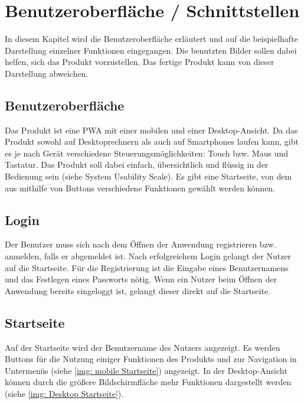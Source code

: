 \renewcommand{\figurename}{Abb.}
\section{Benutzeroberfläche / Schnittstellen}
In diesem Kapitel wird die Benutzeroberfläche erläutert und auf die beispielhafte Darstellung einzelner Funktionen eingegangen. Die benutzten Bilder sollen dabei helfen, sich das Produkt vorzustellen. Das fertige Produkt kann von dieser Darstellung abweichen.
\subsection{Benutzeroberfläche}
Das Produkt ist eine \Gls{PWA} mit einer mobilen und einer \Gls{Desktop}-Ansicht. Da das Produkt sowohl auf \Gls{Desktop}rechnern als auch auf Smartphones laufen kann, gibt es je nach Gerät verschiedene Steuerungsmöglichkeiten: Touch bzw. Maus und Tastatur. Das Produkt soll dabei einfach, übersichtlich und flüssig in der Bedienung sein (siehe \Gls{System Usability Scale}).
Es gibt eine Startseite, von dem aus mithilfe von Buttons verschiedene Funktionen gewählt werden können.

\subsection{Login}
Der Benutzer muss sich nach dem Öffnen der Anwendung registrieren bzw. anmelden, falls er abgemeldet ist. Nach erfolgreichem \Gls{Login} gelangt der Nutzer auf die Startseite. Für die Registrierung ist die Eingabe eines Benutzernamens und das Festlegen eines Passworts nötig. Wenn ein Nutzer beim Öffnen der Anwendung bereits eingeloggt ist, gelangt dieser direkt auf die Startseite.

\subsection{Startseite}
Auf der Startseite wird der Benutzername des Nutzers angezeigt. Es werden Buttons für die Nutzung einiger Funktionen des Produkts und zur Navigation in Untermenüs (siehe \autoref{img: mobile Startseite}) angezeigt. In der Desktop-Ansicht können durch die größere Bildschirmfläche mehr Funktionen dargestellt werden (siehe \autoref{img: Desktop Startseite}).
\begin{figure}[H]
\begin{minipage}{.5\textwidth}
    \centering
    
    \label{img: mobile Startseite}
\end{minipage}
\begin{minipage}{.5\textwidth}
 \centering
    
    \label{img: Desktop Startseite}
\end{minipage}%
\end{figure}

